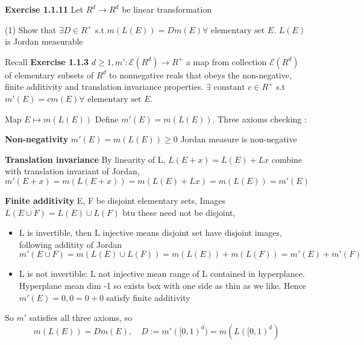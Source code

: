\textbf{Exercise 1.1.11} Let $R^d \rightarrow R^d$ be linear transformation

\vspace{2cm}
(1) Show that $\exists D \in R^+$ s.t $m(L(E)) = Dm(E) \forall \text{ elementary set } E$. $L(E)$ is Jordan measurable

Recall \textbf{Exercise 1.1.3} $d \ge 1, m': \mathcal{E}(R^d) \rightarrow R^+ $ a map from collection $\mathcal{E}(R^d)$ of elementary subsets of $R^d$ to nonnegative reals that obeys the non-negative, finite additivity and translation invariance properties. 
$\exists \text{ constant } c \in R^+$ s.t $m'(E) = cm(E) \forall \text{ elementary set } E$.






Map $E \mapsto m(L(E))$ 
Define $m'(E) = m(L(E))$. Three axioms checking :

\textbf{Non-negativity} $m'(E) = m(L(E)) \ge 0$ Jordan measure is non-negative

\textbf{Translation invariance} By linearity of L, $L(E+x) = L(E) + Lx$ combine with translation invariant of Jordan,
\[
m'(E+x) = m(L(E+x)) =  m(L(E) +Lx) = m(L(E)) = m'(E)
\]

\textbf{Finite additivity} E, F be disjoint elementary sets, Images $L(E \cup F) = L(E) \cup L(F)$ btu these need not be disjoint,
\begin{itemize}
    \item L is invertible, then L injective means disjoint set have disjoint images, following additity of Jordan 
    \[
    m'(E \cup F) = m(L(E) \cup L(F)) = m(L(E)) + m(L(F)) = m'(E) + m'(F)  
    \]
    \item L is not invertible: L not injective mean range of L contained in hyperplance. Hyperplane mean dim -1 so exists box with one side as thin as we like. Hence $m'(E) = 0, 0 = 0 + 0$ satisfy finite additivity
\end{itemize}
So $m'$ satisfies all three axioms, so 
\[
m(L(E)) = Dm(E), \quad D:= m'([0,1)^d) = m(L([0,1)^d)
\]

